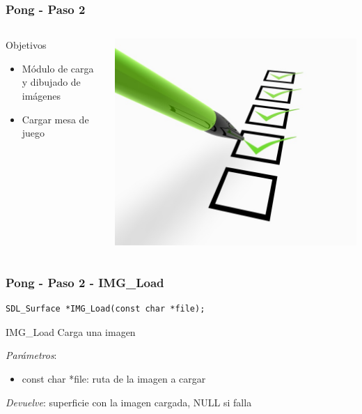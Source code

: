 \begin{frame}
	\frametitle{Pong - Paso 2}
    \begin{columns}[c]
	\column{175pt}
	\begin{block}{Objetivos}
		\begin{itemize}
			\item Módulo de carga y dibujado de imágenes
			\item Cargar mesa de juego
		\end{itemize}            
	\end{block}

    \column{125pt}
	\begin{center}
		\includegraphics[scale=0.6]{img/checklist.jpg}
	\end{center}	
	
    \end{columns}
\end{frame}

\begin{frame}[fragile]
    \frametitle{Pong - Paso 2 - IMG\_Load}
	
\begin{verbatim}
SDL_Surface *IMG_Load(const char *file);
\end{verbatim}

    \begin{block}{IMG\_Load}
	Carga una imagen
	
	\emph{Parámetros}:
	\begin{itemize}
	    \item const char *file: ruta de la imagen a cargar
	\end{itemize}
	
	\emph{Devuelve}: superficie con la imagen cargada, NULL si falla
    \end{block}

\end{frame}

